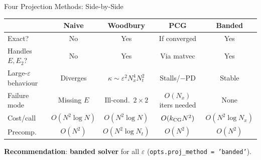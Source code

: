 \documentclass[10pt,aspectratio=169]{beamer}
\newcommand{\eps}{\varepsilon}
\begin{document}
\begin{frame}{Four Projection Methods: Side-by-Side}
  \renewcommand{\arraystretch}{1.3}
  \begin{center}
  {\footnotesize
  \begin{tabular}{@{}lcccc@{}}
    \toprule
    & \textbf{Naive} & \textbf{Woodbury} & \textbf{PCG} & \textbf{Banded} \\
    \midrule
    Exact?
      & {\color{myred}No}
      & {\color{mygreen}Yes}
      & {\color{warnorange}If converged}
      & {\color{mygreen}Yes} \\
    Handles $E,E_2$?
      & {\color{myred}No}
      & {\color{mygreen}Yes}
      & {\color{warnorange}Via matvec}
      & {\color{mygreen}Yes} \\
    Large-$\eps$ behaviour
      & {\color{myred}Diverges}
      & {\color{warnorange}$\kappa\!\sim\!\eps^2N_x^4N_t^2$}
      & {\color{myred}Stalls/$-$PD}
      & {\color{mygreen}Stable} \\
    Failure mode
      & Missing $E$
      & Ill-cond.\ $2{\times}2$
      & $O(N_x)$ iters needed
      & None \\
    \midrule
    Cost/call
      & $O(N^2\!\log N)$
      & $O(N^2\!\log N)$
      & $O(k_{\rm CG}N^2)$
      & $O(N^2\!\log N_x)$ \\
    Precomp.
      & $O(N^2)$
      & $O(N^2\!\log N_t)$
      & $O(N^2)$
      & $O(N^2)$ \\
    \bottomrule
  \end{tabular}}
  \end{center}

  \smallskip
  \textbf{Recommendation}: \textbf{banded solver} for all $\eps$
  (\texttt{opts.proj\_method = 'banded'}).
\end{frame}
\end{document}

